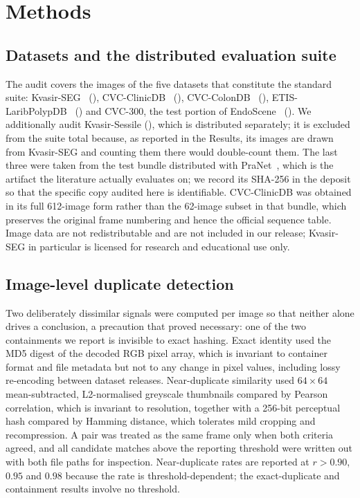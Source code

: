 \documentclass[11pt]{article}
\begin{document}
\section*{Methods}

\subsection*{Datasets and the distributed evaluation suite}
The audit covers the \NimagesTotal{} images of the five datasets that
constitute the standard suite: Kvasir-SEG~\citep{jha2020kvasirseg}
(\NKvasir{}), CVC-ClinicDB~\citep{bernal2015clinicdb} (\NClinic{}),
CVC-ColonDB~\citep{bernal2012colondb} (\NColon{}),
ETIS-LaribPolypDB~\citep{silva2014etis} (\NEtis{}) and CVC-300, the test
portion of EndoScene~\citep{vazquez2017endoscene} (\NCVCThree{}). We
additionally audit Kvasir-Sessile (\SessileN{}), which is distributed
separately; it is excluded from the suite total because, as reported in the
Results, its images are drawn from Kvasir-SEG and counting them there would
double-count them. The last
three were taken from the test bundle distributed with
PraNet~\citep{fan2020pranet}, which is the artifact the literature actually
evaluates on; we record its SHA-256 in the deposit so that the specific copy
audited here is identifiable. CVC-ClinicDB was obtained in its full 612-image
form rather than the 62-image subset in that bundle, which preserves the
original frame numbering and hence the official sequence table. Image data
are not redistributable and are not included in our release; Kvasir-SEG in
particular is licensed for research and educational use only.

\subsection*{Image-level duplicate detection}
Two deliberately dissimilar signals were computed per image so that neither
alone drives a conclusion, a precaution that proved necessary: one of the two
containments we report is invisible to exact hashing. Exact identity used the
MD5 digest of the decoded RGB pixel array, which is invariant to container
format and file metadata but not to any change in pixel values, including
lossy re-encoding between dataset releases. Near-duplicate similarity used
$64 \times 64$ mean-subtracted, L2-normalised greyscale thumbnails compared by
Pearson correlation, which is invariant to resolution, together with a
256-bit perceptual hash compared by Hamming distance, which tolerates mild
cropping and recompression. A pair was treated as the same frame only when
both criteria agreed, and all candidate matches above the reporting threshold
were written out with both file paths for inspection. Near-duplicate rates are
reported at $r > 0.90$, $0.95$ and $0.98$ because the rate is
threshold-dependent; the exact-duplicate and containment results involve no
threshold.
\end{document}
